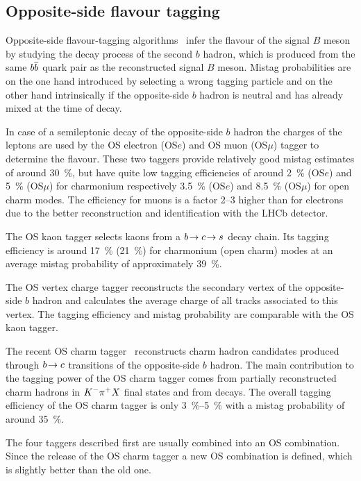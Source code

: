 
\subsection{Opposite-side flavour tagging}
\label{sec:detector:tagging:ostagging}

Opposite-side flavour-tagging algorithms~\cite{LHCb-PAPER-2011-027} infer the
flavour of the signal $B$ meson by studying the decay process of the second
$b$ hadron, which is produced from the same ${{b}{\overline {{b}}}}$ quark pair as the
reconstructed signal $B$ meson. Mistag probabilities are on the one hand
introduced by selecting a wrong tagging particle and on the other hand
intrinsically if the opposite-side $b$ hadron is neutral and has already mixed
at the time of decay.

In case of a semileptonic decay of the opposite-side $b$ hadron the charges of
the leptons are used by the OS electron (OS$e$) and OS muon (OS$\mu$) tagger
to determine the flavour. These two taggers provide relatively good mistag
estimates of around \SI{30}{\percent}, but have quite low tagging efficiencies
of around \SI{2}{\percent} (OS$e$) and \SI{5}{\percent} (OS$\mu$) for
charmonium respectively \SI{3.5}{\percent} (OS$e$) and \SI{8.5}{\percent}
(OS$\mu$) for open charm modes. The efficiency for muons is a factor
\numrange{2}{3} higher than for electrons due to the better reconstruction and
identification with the LHCb detector.

The OS kaon tagger selects kaons from a ${b}\!\rightarrow{\ensuremath{c}}\!\rightarrow{\ensuremath{s}}$
decay chain. Its tagging efficiency is around \SI{17}{\percent}
(\SI{21}{\percent}) for charmonium (open charm) modes at an average mistag
probability of approximately \SI{39}{\percent}.

The OS vertex charge tagger reconstructs the secondary vertex of the
opposite-side $b$ hadron and calculates the average charge of all tracks
associated to this vertex. The tagging efficiency and mistag probability are
comparable with the OS kaon tagger.

The recent OS charm tagger~\cite{LHCb-PAPER-2015-027} reconstructs charm
hadron candidates produced through ${b}\!\rightarrow{\ensuremath{c}}$ transitions of the
opposite-side $b$ hadron. The main contribution to the tagging power of the OS
charm tagger comes from partially reconstructed charm hadrons in ${{K}^-}{{\pi}^+} X$
final states and from \DzToKpi decays. The overall tagging efficiency of the
OS charm tagger is only \SIrange{3}{5}{\percent} with a mistag probability of
around \SI{35}{\percent}.

The four taggers described first are usually combined into an OS combination.
Since the release of the OS charm tagger a new OS combination is defined,
which is slightly better than the old one.
